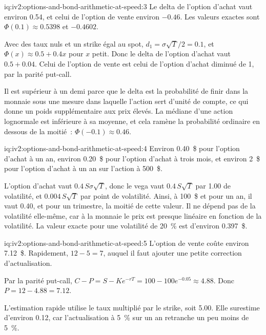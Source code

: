 \begin{solution}{iq:iv2:options-and-bond-arithmetic-at-speed:3}
Le delta de l'option d'achat vaut environ 0.54, et celui de l'option de vente environ $-0.46$. Les valeurs exactes sont $\Phi(0.1) \approx 0.5398$ et $-0.4602$.

Avec des taux nuls et un strike égal au spot, $d_1 = \sigma\sqrt T/2 = 0.1$, et $\Phi(x) \approx 0.5 + 0.4x$ pour $x$ petit. Donc le delta de l'option d'achat vaut $0.5 + 0.04$. Celui de l'option de vente est celui de l'option d'achat diminué de 1, par la parité put-call.

Il est supérieur à un demi parce que le delta est la probabilité de finir dans la monnaie sous une mesure dans laquelle l'action sert d'unité de compte, ce qui donne un poids supplémentaire aux prix élevés. La médiane d'une action lognormale est inférieure à sa moyenne, et cela ramène la probabilité ordinaire en dessous de la moitié~: $\Phi(-0.1) \approx 0.46$.

\end{solution}

\begin{solution}{iq:iv2:options-and-bond-arithmetic-at-speed:4}
Environ 0.40~\$ pour l'option d'achat à un an, environ 0.20~\$ pour l'option d'achat à trois mois, et environ 2~\$ pour l'option d'achat à un an sur l'action à 500~\$.

L'option d'achat vaut $0.4\,S\sigma\sqrt T$, donc le vega vaut $0.4\,S\sqrt T$ par 1.00 de volatilité, et $0.004\,S\sqrt T$ par point de volatilité. Ainsi, à 100~\$ et pour un an, il vaut 0.40, et pour un trimestre, la moitié de cette valeur. Il ne dépend pas de la volatilité elle-même, car à la monnaie le prix est presque linéaire en fonction de la volatilité. La valeur exacte pour une volatilité de 20~\% est d'environ 0.397~\$.

\end{solution}

\begin{solution}{iq:iv2:options-and-bond-arithmetic-at-speed:5}
L'option de vente coûte environ 7.12~\$. Rapidement, $12 - 5 = 7$, auquel il faut ajouter une petite correction d'actualisation.

Par la parité put-call, $C - P = S - Ke^{-rT} = 100 - 100e^{-0.05} \approx 4.88$. Donc $P = 12 - 4.88 = 7.12$.

L'estimation rapide utilise le taux multiplié par le strike, soit 5.00. Elle surestime d'environ 0.12, car l'actualisation à 5~\% sur un an retranche un peu moins de 5~\%.

\end{solution}

